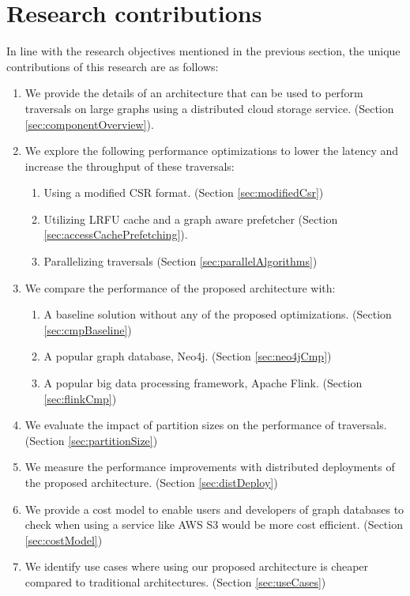 \section{Research contributions}
In line with the research objectives mentioned in the previous section, the 
unique contributions of this research are as follows:
\begin{enumerate}
    \item We provide the details of an architecture that can be used to perform 
        traversals on large graphs using a distributed cloud storage service. 
        (Section \ref{sec:componentOverview}). 
    \item We explore the following performance optimizations to lower the latency and
        increase the throughput of these traversals:
        \begin{enumerate}
            \item Using a modified CSR format. (Section \ref{sec:modifiedCsr})
            \item Utilizing LRFU cache and a graph aware prefetcher 
                (Section \ref{sec:accessCachePrefetching}).
            \item Parallelizing traversals (Section
                \ref{sec:parallelAlgorithms})
        \end{enumerate}
    \item We compare the performance of the proposed architecture with:
        \begin{enumerate}
            \item A baseline solution without any of the proposed optimizations.
                (Section \ref{sec:cmpBaseline})
            \item A popular graph database, Neo4j. (Section \ref{sec:neo4jCmp})
            \item A popular big data processing framework, Apache Flink.
                (Section \ref{sec:flinkCmp})
        \end{enumerate}
    \item We evaluate the impact of partition sizes on the performance of
        traversals. (Section \ref{sec:partitionSize})
    \item We measure the performance improvements with distributed deployments
        of the proposed architecture. (Section \ref{sec:distDeploy})
    \item We provide a cost model to enable users and developers of graph
        databases to check when using a service like AWS S3 would be more cost
        efficient. (Section \ref{sec:costModel})
    \item We identify use cases where using our proposed architecture is
        cheaper compared to traditional architectures. (Section \ref{sec:useCases})
\end{enumerate}


